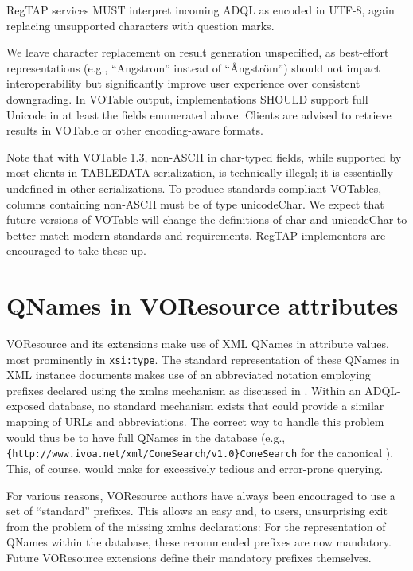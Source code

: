 \documentclass[11pt,a4paper]{ivoa}
\begin{document}
RegTAP services MUST interpret incoming ADQL as encoded in UTF-8,
again replacing unsupported characters with question marks.

We leave character replacement on result generation unspecified, as
best-effort representations (e.g., ``Angstrom'' instead of ``Ångström'')
should not impact interoperability but significantly improve user
experience over consistent downgrading.  In VOTable output,
implementations SHOULD support full Unicode in at least the fields
enumerated above.  Clients are advised to retrieve results in VOTable or
other encoding-aware formats.

Note that with VOTable 1.3, non-ASCII in char-typed fields, while
supported by most clients in TABLEDATA serialization, is technically
illegal; it is essentially undefined in other serializations.  To
produce standards-compliant VOTables, columns containing non-ASCII must
be of type unicodeChar.  We expect that future versions of VOTable will
change the definitions of char and unicodeChar to better match modern
standards and requirements.  RegTAP implementors are encouraged to take
these up.


\section{QNames in VOResource attributes}

\label{qnameatts}

VOResource and its extensions make use of XML QNames in attribute
values, most prominently in \texttt{xsi:type}.  The standard
representation of these QNames in XML instance documents makes use of an
abbreviated notation employing prefixes declared using the xmlns mechanism
as discussed in \citet{std:XMLNS}.  Within an ADQL-exposed database, no
standard mechanism exists that could provide a similar mapping of URLs
and abbreviations.  The correct way to handle this problem would thus be
to have full QNames in the database (e.g.,
\verb|{http://www.ivoa.net/xml/ConeSearch/v1.0}ConeSearch| for the
canonical ).  This, of course, would make for
excessively tedious and error-prone querying.

For various reasons, VOResource authors have always been encouraged
to use a set of ``standard'' prefixes.  This allows an easy and, to users,
unsurprising exit from the problem of the missing xmlns declarations:
For the representation of QNames within the database, these recommended
prefixes are now mandatory. Future VOResource extensions define their
mandatory prefixes themselves.
\end{document}

